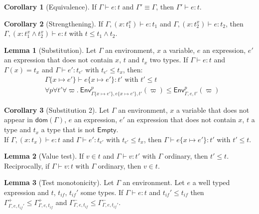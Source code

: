 \documentclass[a4paper]{article}%
\newcommand{\dom}[1]{\textsf{dom}(#1)}
\newcommand{\Empty} {\textsf{Empty}}%
\newcommand{\subst}[2]{\{#1 \mapsto #2\}}
\newcommand{\Gp}[2]{\textsf{Env}^{#1}_{#2}}
\theoremstyle{definition}
\newtheorem{lemma}{Lemma}
\newtheorem{corollary}{Corollary}
\begin{document}
    \begin{corollary}[Equivalence]
      If $\Gamma \vdash e:t$ and $\Gamma' \equiv \Gamma$, then $\Gamma' \vdash e:t$.
    \end{corollary}

    \begin{corollary}[Strengthening]
      If $\Gamma, (x:t_1^x) \vdash e:t_1$ and $\Gamma, (x:t_2^x) \vdash e:t_2$, then
      $\Gamma, (x:t_1^x\land t_2^x) \vdash e:t$ with $t \leq t_1\land t_2$.
    \end{corollary}

    \begin{lemma}[Substitution]
      Let $\Gamma$ an environment, $x$ a variable, $e$ an expression, $e'$ an expression that does not contain $x$, $t$ and $t_x$ two types.
      If $\Gamma \vdash e:t$ and $\Gamma(x) = t_x$ and $\Gamma \vdash e':t_{e'}$ with $t_{e'} \leq t_x$, then:
      \begin{align*}
        &\Gamma \subst x {e'} \vdash e \subst x {e'}:t' \text{ with } t'\leq t\\
        &\forall p \forall t' \forall \varpi.\ \Gp p {\Gamma\subst x {e'},e\subst x {e'},t'} (\varpi) \leq \Gp p {\Gamma,e,t'} (\varpi)
      \end{align*}
    \end{lemma}

    \begin{corollary}[Substitution 2]
      Let $\Gamma$ an environment, $x$ a variable that does not appear in $\dom \Gamma$, $e$ an expression, $e'$ an expression that does not contain $x$, $t$ a type and $t_x$ a type that is not $\Empty$.\\
      If $\Gamma, (x:t_x) \vdash e:t$ and $\Gamma \vdash e':t_{e'}$ with $t_{e'} \leq t_x$, then $\Gamma \vdash e \subst x {e'}:t'$ with $t'\leq t$.
    \end{corollary}

    \begin{lemma}[Value test]
      If $v \in t$ and $\Gamma \vdash v : t'$ with $\Gamma$ ordinary, then $t' \leq t$.
      Reciprocally, if $\Gamma \vdash v : t$ with $\Gamma$ ordinary, then $v \in t$.
    \end{lemma}

    \begin{lemma}[Test monotonicity]
      Let $\Gamma$ an environment. Let $e$ a well typed expression and $t$, $t_{if}$, $t_{if}'$ some types.
      If $\Gamma \vdash e : t$ and $t_{if}' \leq t_{if}$ then $\Gamma^+_{\Gamma,e,t_{if}'} \leq \Gamma^+_{\Gamma,e,t_{if}}$
      and $\Gamma^-_{\Gamma,e,t_{if}} \leq \Gamma^-_{\Gamma,e,t_{if}'}$.
    \end{lemma}
\end{document}
